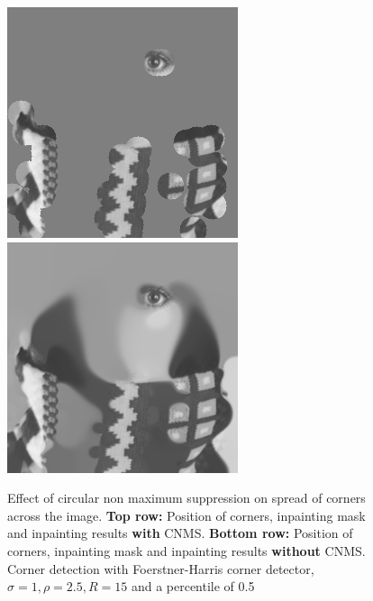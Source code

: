 \begin{figure}
    \includegraphics[width=0.31\linewidth]{../Images/trui/trui-mask_non_cnms.png}
    \includegraphics[width=0.31\linewidth]{../Images/trui/trui-inpaint_non_cnms.png}
    \caption{Effect of circular non maximum suppression on spread of corners across the image.
        \textbf{Top row:} Position of corners, inpainting mask and inpainting results
        \textbf{with} CNMS.
\textbf{Bottom row:} Position of corners, inpainting mask and inpainting results \textbf{without} CNMS.
    Corner detection with Foerstner-Harris corner detector, $\sigma=1,\rho=2.5,R=15$ and a
percentile of 0.5}
    \label{fig:CNMSExample}
\end{figure}
